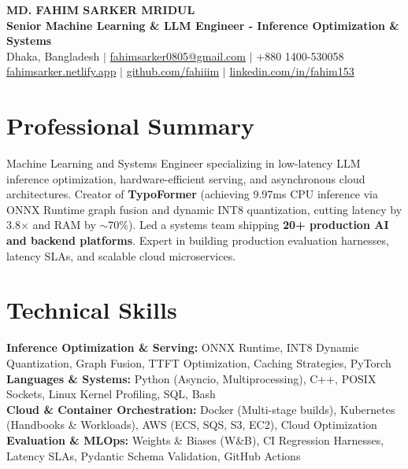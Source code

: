 \documentclass[9.5pt,a4paper]{article}
\begin{document}
{\centering
    {\Large \textbf{MD. FAHIM SARKER MRIDUL}}\\[1pt]
    \textbf{Senior Machine Learning \& LLM Engineer - Inference Optimization \& Systems}\\[1pt]
    Dhaka, Bangladesh \;$\vert$\; \href{mailto:fahimsarker0805@gmail.com}{fahimsarker0805@gmail.com} \;$\vert$\; +880 1400-530058\\[1pt]
    \href{https://fahimsarker.netlify.app}{fahimsarker.netlify.app} \;$\vert$\; \href{https://github.com/fahiiim}{github.com/fahiiim} \;$\vert$\; \href{https://linkedin.com/in/fahim153}{linkedin.com/in/fahim153}\par
}

\vspace{-2.5pt}
\section*{Professional Summary}
Machine Learning and Systems Engineer specializing in low-latency LLM inference optimization, hardware-efficient serving, and asynchronous cloud architectures. Creator of \textbf{TypoFormer} (achieving 9.97ms CPU inference via ONNX Runtime graph fusion and dynamic INT8 quantization, cutting latency by 3.8$\times$ and RAM by $\sim$70\%). Led a systems team shipping \textbf{20+ production AI and backend platforms}. Expert in building production evaluation harnesses, latency SLAs, and scalable cloud microservices.

\section*{Technical Skills}
\noindent
\textbf{Inference Optimization \& Serving:} ONNX Runtime, INT8 Dynamic Quantization, Graph Fusion, TTFT Optimization, Caching Strategies, PyTorch\\
\textbf{Languages \& Systems:} Python (Asyncio, Multiprocessing), C++, POSIX Sockets, Linux Kernel Profiling, SQL, Bash\\
\textbf{Cloud \& Container Orchestration:} Docker (Multi-stage builds), Kubernetes (Handbooks \& Workloads), AWS (ECS, SQS, S3, EC2), Cloud Optimization\\
\textbf{Evaluation \& MLOps:} Weights \& Biases (W\&B), CI Regression Harnesses, Latency SLAs, Pydantic Schema Validation, GitHub Actions
\end{document}
